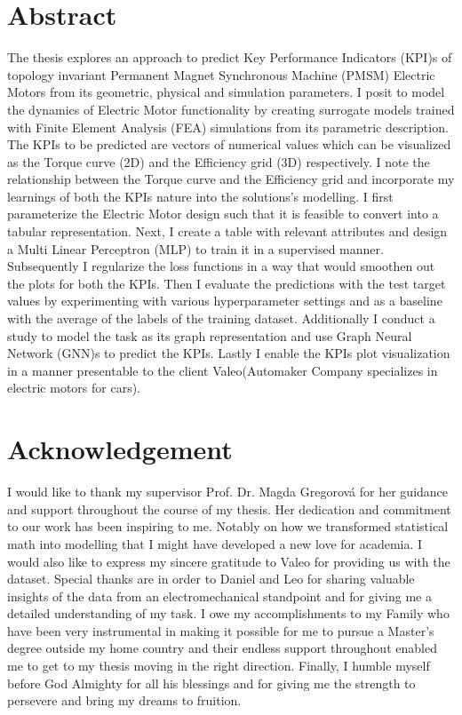 \documentclass{report} %
\begin{document}
\chapter*{Abstract}

The thesis explores an approach to predict Key Performance Indicators (KPI)s of topology invariant Permanent Magnet Synchronous Machine 
(PMSM) Electric Motors from its geometric, physical and simulation parameters.
I posit to model the dynamics of Electric Motor functionality by creating surrogate models trained with Finite Element Analysis (FEA) simulations from its parametric description.
The KPIs to be predicted are vectors of numerical values which can be visualized as the Torque curve (2D) and the Efficiency grid (3D) respectively.
I note the relationship between the Torque curve and the Efficiency grid and incorporate my learnings of both the KPIs nature into the solutions's modelling.
I first parameterize the Electric Motor design such that it is feasible to convert into a tabular representation.
Next, I create a table with relevant attributes and design a Multi Linear Perceptron (MLP) to train it in a supervised manner.
Subsequently I regularize the loss functions in a way that would smoothen out the plots for both the KPIs.
Then I evaluate the predictions with the test target values by experimenting with various hyperparameter settings 
and as a baseline with the average of the labels of the training dataset.
Additionally I conduct a study to model the task as its graph representation and use Graph Neural Network (GNN)s to predict the KPIs.
Lastly I enable the KPIs plot visualization in a manner presentable to the client Valeo(Automaker Company specializes in  electric motors for cars).

\chapter*{Acknowledgement}
I would like to thank my supervisor Prof. Dr. Magda Gregorová for her guidance and support throughout the course of my thesis.
Her dedication and commitment to our work has been inspiring to me. Notably on how we transformed statistical math into modelling that I might have developed a 
new love for academia. I would also like to express my sincere gratitude to Valeo for providing us with the dataset.
Special thanks are in order to Daniel and Leo for sharing valuable insights of the data from an electromechanical standpoint and for giving me a detailed understanding 
of my task. I owe my accomplishments to my Family who have been very instrumental in making it possible for me to pursue a Master's degree outside my home country 
and their endless support throughout enabled me to get to my thesis moving in the right direction. Finally, I humble myself before God Almighty for all his blessings 
and for giving me the strength to persevere and bring my dreams to fruition.
\end{document}
